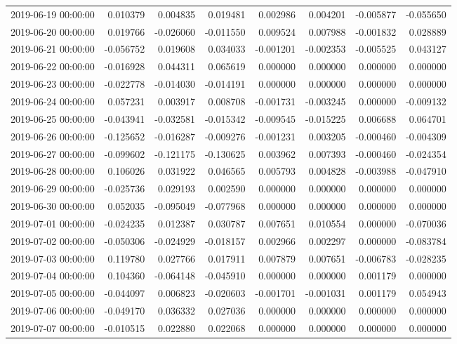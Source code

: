 \begin{tabular}{lrrrrrrr}
2019-06-19 00:00:00 & 0.010379 & 0.004835 & 0.019481 & 0.002986 & 0.004201 & -0.005877 & -0.055650 \\
2019-06-20 00:00:00 & 0.019766 & -0.026060 & -0.011550 & 0.009524 & 0.007988 & -0.001832 & 0.028889 \\
2019-06-21 00:00:00 & -0.056752 & 0.019608 & 0.034033 & -0.001201 & -0.002353 & -0.005525 & 0.043127 \\
2019-06-22 00:00:00 & -0.016928 & 0.044311 & 0.065619 & 0.000000 & 0.000000 & 0.000000 & 0.000000 \\
2019-06-23 00:00:00 & -0.022778 & -0.014030 & -0.014191 & 0.000000 & 0.000000 & 0.000000 & 0.000000 \\
2019-06-24 00:00:00 & 0.057231 & 0.003917 & 0.008708 & -0.001731 & -0.003245 & 0.000000 & -0.009132 \\
2019-06-25 00:00:00 & -0.043941 & -0.032581 & -0.015342 & -0.009545 & -0.015225 & 0.006688 & 0.064701 \\
2019-06-26 00:00:00 & -0.125652 & -0.016287 & -0.009276 & -0.001231 & 0.003205 & -0.000460 & -0.004309 \\
2019-06-27 00:00:00 & -0.099602 & -0.121175 & -0.130625 & 0.003962 & 0.007393 & -0.000460 & -0.024354 \\
2019-06-28 00:00:00 & 0.106026 & 0.031922 & 0.046565 & 0.005793 & 0.004828 & -0.003988 & -0.047910 \\
2019-06-29 00:00:00 & -0.025736 & 0.029193 & 0.002590 & 0.000000 & 0.000000 & 0.000000 & 0.000000 \\
2019-06-30 00:00:00 & 0.052035 & -0.095049 & -0.077968 & 0.000000 & 0.000000 & 0.000000 & 0.000000 \\
2019-07-01 00:00:00 & -0.024235 & 0.012387 & 0.030787 & 0.007651 & 0.010554 & 0.000000 & -0.070036 \\
2019-07-02 00:00:00 & -0.050306 & -0.024929 & -0.018157 & 0.002966 & 0.002297 & 0.000000 & -0.083784 \\
2019-07-03 00:00:00 & 0.119780 & 0.027766 & 0.017911 & 0.007879 & 0.007651 & -0.006783 & -0.028235 \\
2019-07-04 00:00:00 & 0.104360 & -0.064148 & -0.045910 & 0.000000 & 0.000000 & 0.001179 & 0.000000 \\
2019-07-05 00:00:00 & -0.044097 & 0.006823 & -0.020603 & -0.001701 & -0.001031 & 0.001179 & 0.054943 \\
2019-07-06 00:00:00 & -0.049170 & 0.036332 & 0.027036 & 0.000000 & 0.000000 & 0.000000 & 0.000000 \\
2019-07-07 00:00:00 & -0.010515 & 0.022880 & 0.022068 & 0.000000 & 0.000000 & 0.000000 & 0.000000 \\

\end{tabular}
